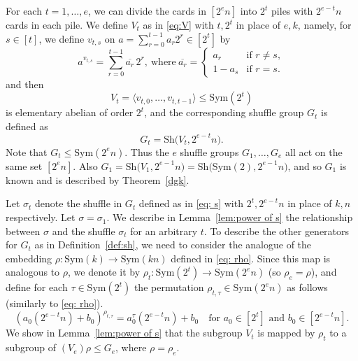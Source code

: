 \documentclass[12pt]{amsart}
\theoremstyle{remark}
\theoremstyle{definition}
\newcommand{\sym}{\mathrm{Sym}}
\newcommand{\sh}{\mathrm{Sh}}
\begin{document}
For each $t=1, \dots, e$, we can divide the cards in $ [2^e n]$ into $2^t$ piles with $2^{e-t}n$ cards in each pile. 
We define $V_{t}$ as in \eqref{eq:V} with $t, 2^t$ in place of $e, k$, namely, for $s\in [t]$, we define $v_{t,s}$ on 
$a=\sum_{r=0}^{t-1}a_r 2^{r}\in [2^t]$ by 
\begin{equation} \label{eq:vt-action}
	a^{v_{t,s}} = \sum_{r=0}^{t-1} \overline{a_r}\, 2^{r}, \ \text{where} \ 
	\overline{a_r} = 
	\begin{cases} a_r &\text{if } r \neq s, \\ 1-a_s &\text{if } r = s. \end{cases}
	\end{equation}
and then
\[
V_t = \langle v_{t,0}, \dots, v_{t,t-1}\rangle \leqslant\sym(2^t)
\]
is elementary abelian of order $2^t$, and the corresponding shuffle group $G_t$ is defined as
	\begin{equation} \label{eq:G_t}
	G_t = \sh\big(V_{t},2^{e-t}n\big).
	\end{equation}
Note that $G_t \leqslant \sym(2^e n)$. Thus the $e$ shuffle groups $G_1, \ldots, G_e$ all act on the same set $[2^e n ]$. Also $G_1 = \sh\big(V_1,2^{e-1}n\big) = \sh\big(\sym(2),2^{e-1}n\big)$, and so $G_1$ is known and is  described by Theorem~\ref{dgk}.

Let $\sigma_t$ denote the shuffle in $G_t$ defined as in \eqref{eq: s} with $2^t, 2^{e-t}n$ in place of $k, n$ respectively.  Let $\sigma = \sigma_1$. We describe in Lemma~\ref{lem:power of s} the relationship between $\sigma$ and the shuffle 
$\sigma_t$ for an arbitrary $t$. 
To describe the other generators for $G_t$ as in Definition~\ref{def:sh}, we need to consider the analogue of the embedding $\rho: \sym(k)\rightarrow 
\sym(kn)$ defined in \eqref{eq: rho}.  Since this map is analogous to $\rho$, we denote it by $\rho_t: \sym(2^t)\rightarrow 
\sym(2^en)$ (so $\rho_e=\rho$), and define for each $\tau\in\sym(2^t)$ the permutation $\rho_{t,\tau}\in\sym(2^en)$ as follows (similarly to \eqref{eq: rho}).
\begin{equation}\label{eq:rhot}
 (a_0(2^{e-t}n)+b_0)^{\rho_{t,\tau}} = a_0^\tau (2^{e-t}n) + b_0     \quad \mbox{for $a_0\in [2^t]$ and $b_0\in [2^{e-t}n]$.}
\end{equation}  
We show in Lemma~\ref{lem:power of s} that the subgroup $V_t$ is mapped by $\rho_t$ to a subgroup of $(V_e)\rho\leqslant G_e$, where $\rho=\rho_e$.
\end{document}
